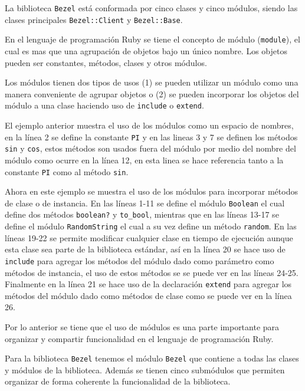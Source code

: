 La biblioteca \texttt{Bezel} está conformada por cinco clases y cinco módulos,
siendo las clases principales \texttt{Bezel::Client} y \texttt{Bezel::Base}.

En el lenguaje de programación Ruby se tiene el concepto de módulo (\texttt{module}),
el cual es mas que una agrupación de objetos bajo un único nombre. Los objetos
pueden ser constantes, métodos, clases y otros módulos.

Los módulos tienen dos tipos de usos (1) se pueden utilizar un módulo como una
manera conveniente de agrupar objetos o (2) se pueden incorporar los objetos del
módulo a una clase haciendo uso de \texttt{include} o \texttt{extend}.



El ejemplo anterior muestra el uso de los módulos como un espacio de nombres,
en la línea 2 se define la constante \texttt{PI} y en las lineas 3 y 7 se definen
los métodos \texttt{sin} y \texttt{cos}, estos métodos son usados fuera del
módulo por medio del nombre del módulo como ocurre en la línea 12, en esta
linea se hace referencia tanto a la constante \texttt{PI} como al método
\texttt{sin}.



Ahora en este ejemplo se muestra el uso de los módulos para incorporar métodos
de clase o de instancia. En las líneas 1-11 se define el módulo \texttt{Boolean}
el cual define dos métodos \texttt{boolean?} y \texttt{to\_bool}, mientras que
en las líneas 13-17 se define el módulo \texttt{RandomString} el cual a su vez
define un método \texttt{random}. En las líneas 19-22 se permite modificar cualquier
clase en tiempo de ejecución aunque esta clase sea parte de la biblioteca estándar,
así en la línea 20 se hace uso de \texttt{include} para agregar los métodos del
módulo dado como parámetro como métodos de instancia, el uso de estos métodos se
se puede ver en las líneas 24-25. Finalmente en la línea 21 se hace uso de la
declaración \texttt{extend} para agregar los métodos del módulo dado como métodos
de clase como se puede ver en la línea 26.

Por lo anterior se tiene que el uso de módulos es una parte importante para
organizar y compartir funcionalidad en el lenguaje de programación Ruby.

Para la biblioteca \texttt{Bezel} tenemos el módulo \texttt{Bezel} que contiene
a todas las clases y módulos de la biblioteca. Además se tienen cinco submódulos
que permiten organizar de forma coherente la funcionalidad de la biblioteca.

